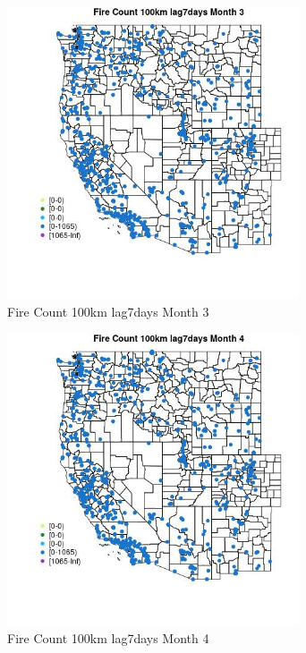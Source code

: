 \begin{figure} 
\centering  
\includegraphics[width=0.77\textwidth]{Code_Outputs/Report_ML_input_PM25_Step4_part_f_de_duplicated_aveswNAs_MapObsMo3Fire_Count_100km_lag7days.jpg} 
\caption{\label{fig:Report_ML_input_PM25_Step4_part_f_de_duplicated_aveswNAsMapObsMo3Fire_Count_100km_lag7days}Fire Count 100km lag7days Month 3} 
\end{figure} 
 

\begin{figure} 
\centering  
\includegraphics[width=0.77\textwidth]{Code_Outputs/Report_ML_input_PM25_Step4_part_f_de_duplicated_aveswNAs_MapObsMo4Fire_Count_100km_lag7days.jpg} 
\caption{\label{fig:Report_ML_input_PM25_Step4_part_f_de_duplicated_aveswNAsMapObsMo4Fire_Count_100km_lag7days}Fire Count 100km lag7days Month 4} 
\end{figure} 
 

